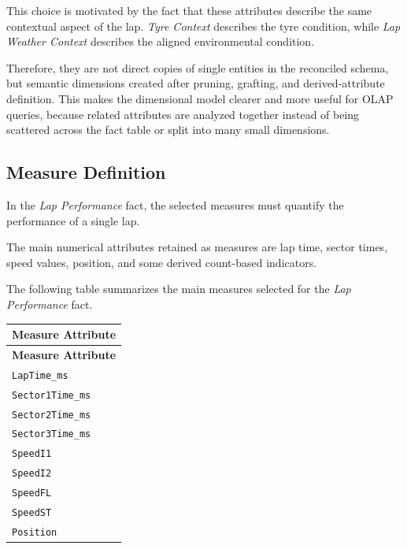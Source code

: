 \documentclass[a4paper,11pt]{article}
\begin{document}
	This choice is motivated by the fact that these attributes describe the same contextual
	aspect of the lap. \textit{Tyre Context} describes the tyre condition, while
	\textit{Lap Weather Context} describes the aligned environmental condition.
	
	Therefore, they are not direct copies of single entities in the reconciled schema, but
	semantic dimensions created after pruning, grafting, and derived-attribute definition.
	This makes the dimensional model clearer and more useful for OLAP queries, because related
	attributes are analyzed together instead of being scattered across the fact table or split
	into many small dimensions.

	
	\subsection{Measure Definition}
	
	In the \textit{Lap Performance}
	fact, the selected measures must quantify the performance of a single lap.
	
	The main numerical attributes retained as measures are lap time, sector times, speed
	values, position, and some derived count-based indicators.
	
	The following table summarizes the main measures selected for the
	\textit{Lap Performance} fact.
	
	\begin{longtable}{|p{8cm}|}
	\hline
	\textbf{Measure Attribute} \\
	\hline
	\endfirsthead
	
	\hline
	\textbf{Measure Attribute} \\
	\hline
	\endhead
	
	\texttt{LapTime\_ms} \\
	\hline
	
	\texttt{Sector1Time\_ms} \\
	\hline
	
	\texttt{Sector2Time\_ms} \\
	\hline
	
	\texttt{Sector3Time\_ms} \\
	\hline
	
	\texttt{SpeedI1} \\
	\hline
	
	\texttt{SpeedI2} \\
	\hline
	
	\texttt{SpeedFL} \\
	\hline
	
	\texttt{SpeedST} \\
	\hline
	
	\texttt{Position} \\
	\hline
	
	\end{longtable}
	
\end{document}
